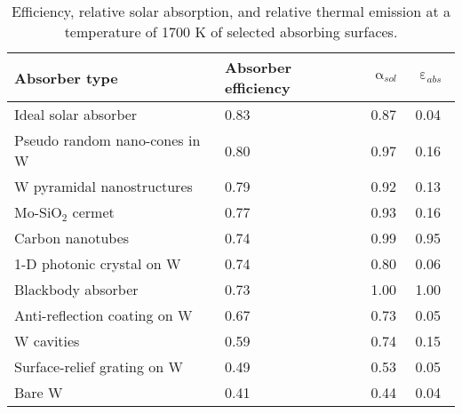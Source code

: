 \documentclass[10pt,letterpaper]{article}
\begin{document}
{\begin{table}
	\caption{Efficiency, relative solar absorption, and relative thermal emission at a temperature of 1700 K of selected absorbing surfaces.}
	\label{abs_eff_table}
	\begin{center}
		\begin{tabular}{|llll|}
			\hline
			Absorber type & Absorber efficiency & $\upalpha_{sol}$ & $\upepsilon_{abs}$\\
			\hline	
			Ideal solar absorber & 0.83 & 0.87 & 0.04\\
			Pseudo random nano-cones in W & 0.80 & 0.97 & 0.16~\cite{me1}\\
			W pyramidal nanostructures & 0.79 & 0.92 & 0.13~\cite{paper1_ref4}\\
			Mo-SiO$_2$ cermet & 0.77 & 0.93 & 0.16~\cite{cermet6}\\
			Carbon nanotubes & 0.74 & 0.99 & 0.95~\cite{MIT_paper}\\
			1-D photonic crystal on W & 0.74 & 0.80 & 0.06~\cite{real_efficient}\\
			Blackbody absorber & 0.73 & 1.00 & 1.00\\
			Anti-reflection coating on W & 0.67 & 0.73 & 0.05~\cite{real_efficient}\\
			W cavities & 0.59 & 0.74 & 0.15~\cite{exp_russia}\\
			Surface-relief grating on W & 0.49 & 0.53 & 0.05~\cite{paper1_ref6}\\
			Bare W & 0.41 & 0.44 & 0.04~\cite{palik}\\
			\hline
		\end{tabular}
	\end{center}
\end{table}

}
\end{document}
